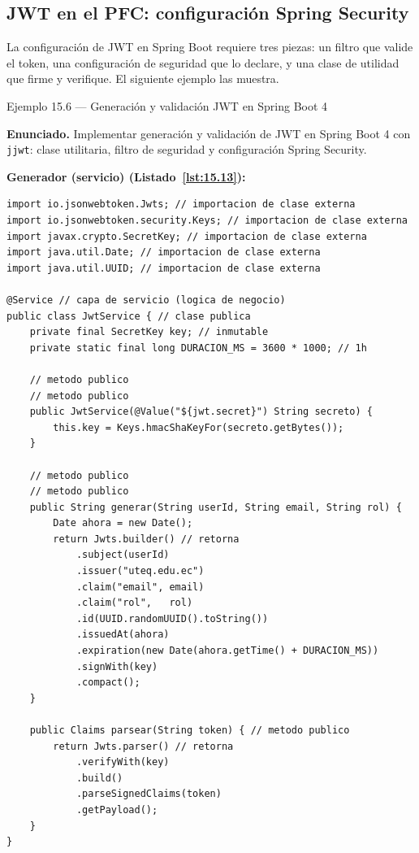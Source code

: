 \subsection{JWT en el PFC: configuración Spring Security}

La configuración de JWT en Spring Boot requiere tres piezas:
un filtro que valide el token, una configuración de seguridad que lo
declare, y una clase de utilidad que firme y verifique. El siguiente
ejemplo las muestra.


\begin{cajaejemplo}{Ejemplo 15.6 --- Generación y validación JWT en Spring Boot 4}

\textbf{Enunciado.} Implementar generación y validación de JWT en Spring Boot 4 con \texttt{jjwt}: clase utilitaria, filtro de seguridad y configuración Spring Security.

\textbf{Generador (servicio) (Listado~\ref{lst:15.13}):}
\begin{lstlisting}[style=java,numbers=none,caption={Ejemplo de Java},label=lst:15.13]
import io.jsonwebtoken.Jwts; // importacion de clase externa
import io.jsonwebtoken.security.Keys; // importacion de clase externa
import javax.crypto.SecretKey; // importacion de clase externa
import java.util.Date; // importacion de clase externa
import java.util.UUID; // importacion de clase externa

@Service // capa de servicio (logica de negocio)
public class JwtService { // clase publica
    private final SecretKey key; // inmutable
    private static final long DURACION_MS = 3600 * 1000; // 1h

    // metodo publico
    // metodo publico
    public JwtService(@Value("${jwt.secret}") String secreto) {
        this.key = Keys.hmacShaKeyFor(secreto.getBytes());
    }

    // metodo publico
    // metodo publico
    public String generar(String userId, String email, String rol) {
        Date ahora = new Date();
        return Jwts.builder() // retorna
            .subject(userId)
            .issuer("uteq.edu.ec")
            .claim("email", email)
            .claim("rol",   rol)
            .id(UUID.randomUUID().toString())
            .issuedAt(ahora)
            .expiration(new Date(ahora.getTime() + DURACION_MS))
            .signWith(key)
            .compact();
    }

    public Claims parsear(String token) { // metodo publico
        return Jwts.parser() // retorna
            .verifyWith(key)
            .build()
            .parseSignedClaims(token)
            .getPayload();
    }
}
\end{lstlisting}


\end{cajaejemplo}
